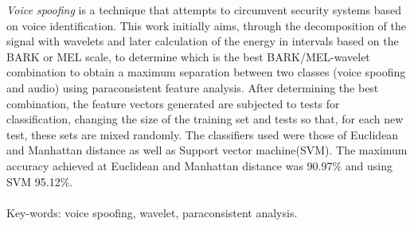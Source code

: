 \begin{myenv}{1.5}
	\fontsize{12}{\baselineskip} \selectfont \onehalfspacing
	\par \null
	\par \null
	\par \textit{Voice spoofing} is a technique that attempts to circumvent security systems based on voice identification. This work initially aims, through the decomposition of the signal with wavelets and later calculation of the energy in intervals based on the BARK or MEL scale, to determine which is the best BARK/MEL-wavelet combination to obtain a maximum separation between two classes (voice spoofing and audio) using paraconsistent feature analysis. After determining the best combination, the feature vectors generated are subjected to tests for classification, changing the size of the training set and tests so that, for each new test, these sets are mixed randomly. The classifiers used were those of Euclidean and Manhattan distance as well as Support vector machine(SVM). The maximum accuracy achieved at Euclidean and Manhattan distance was 90.97\% and using SVM 95.12\%.\\\\
	Key-words: voice spoofing, wavelet, paraconsistent analysis.
\end{myenv}






